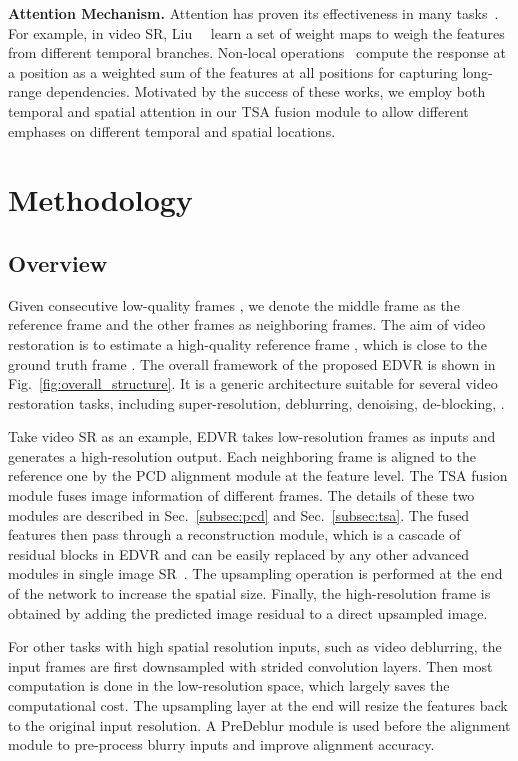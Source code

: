 \documentclass[10pt,twocolumn,letterpaper]{article}
\begin{document}
\noindent\textbf{Attention Mechanism.}
Attention has proven its effectiveness in many tasks~\cite{vaswani2017attention,woo2018cbam,liu2017robust,liu2018non,zhang2018image}. For example, in video SR, Liu~\etal~\cite{liu2017robust} learn a set of weight maps to weigh the features from different temporal branches. Non-local operations~\cite{wang2018non} compute the response at a position as a weighted sum of the features at all positions for capturing long-range dependencies.
Motivated by the success of these works, we employ both temporal and spatial attention in our TSA fusion module to allow different emphases on different temporal and spatial locations.
 \vspace{-0.1cm}
\section{Methodology}
\vspace{-0.1cm}
\subsection{Overview}
\vspace{-0.1cm}
\noindent Given  consecutive low-quality frames , we denote the middle frame  as the reference frame and the other frames as neighboring frames. The aim of video restoration is to estimate a high-quality reference frame , which is close to the ground truth frame .
The overall framework of the proposed EDVR is shown in Fig.~\ref{fig:overall_structure}.
It is a generic architecture suitable for several video restoration tasks, including super-resolution, deblurring, denoising, de-blocking, \etc.

Take video SR as an example, EDVR takes  low-resolution frames as inputs and generates a high-resolution output.
Each neighboring frame is aligned to the reference one by the PCD alignment module at the feature level.
The TSA fusion module fuses image information of different frames.
The details of these two modules are described in Sec.~\ref{subsec:pcd} and Sec.~\ref{subsec:tsa}.
The fused features then pass through a reconstruction module, which is a cascade of residual blocks in EDVR and can be  easily replaced by any other advanced modules in single image SR~\cite{wang2018esrgan,zhang2018image}.
The upsampling operation is performed at the end of the network to increase the spatial size.
Finally, the high-resolution frame  is obtained by adding the predicted image residual to a direct upsampled image. 

For other tasks with high spatial resolution inputs, such as video deblurring, the input frames are first downsampled with strided convolution layers. Then most computation is done in the low-resolution space, which largely saves the computational cost. The upsampling layer at the end will resize the features back to the original input resolution.
A PreDeblur module is used before the alignment module to pre-process blurry inputs and improve alignment accuracy.
\end{document}
